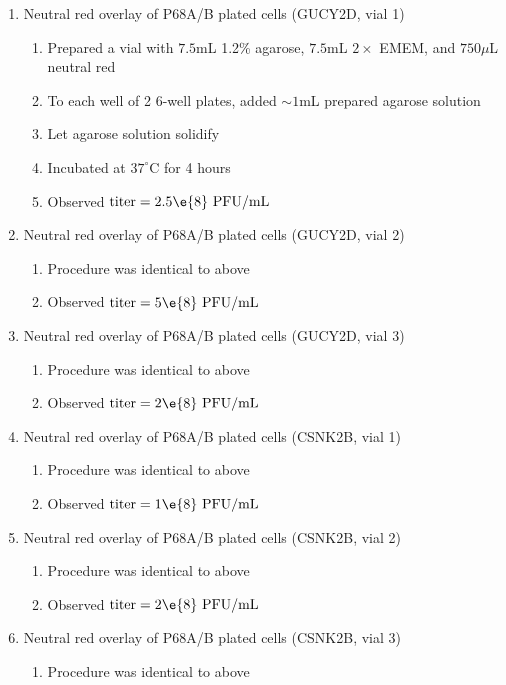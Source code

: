 \begin{enumerate}
	\item Neutral red overlay of P68A/B plated cells (GUCY2D, vial 1)
		\begin{enumerate}
			\item Prepared a vial with $7.5$mL 1.2\% agarose, $7.5$mL $2\times$ EMEM, and $750\mu$L neutral red
			\item To each well of 2 6-well plates, added $\sim 1$mL prepared agarose solution
			\item Let agarose solution solidify
			\item Incubated at $37^{\circ}$C for 4 hours
			\item Observed $\text{titer}=2.5\e{8}\text{ PFU/mL}$
		\end{enumerate}
	\item Neutral red overlay of P68A/B plated cells (GUCY2D, vial 2)
		\begin{enumerate}
			\item Procedure was identical to above
			\item Observed $\text{titer}=5\e{8}\text{ PFU/mL}$
		\end{enumerate}
	\item Neutral red overlay of P68A/B plated cells (GUCY2D, vial 3)
		\begin{enumerate}
			\item Procedure was identical to above
			\item Observed $\text{titer}=2\e{8}\text{ PFU/mL}$
		\end{enumerate}
	\item Neutral red overlay of P68A/B plated cells (CSNK2B, vial 1)
		\begin{enumerate}
			\item Procedure was identical to above
			\item Observed $\text{titer}=1\e{8}\text{ PFU/mL}$
		\end{enumerate}
	\item Neutral red overlay of P68A/B plated cells (CSNK2B, vial 2)
		\begin{enumerate}
			\item Procedure was identical to above
			\item Observed $\text{titer}=2\e{8}\text{ PFU/mL}$
		\end{enumerate}
	\item Neutral red overlay of P68A/B plated cells (CSNK2B, vial 3)
		\begin{enumerate}
			\item Procedure was identical to above

\end{enumerate}
\end{enumerate}
